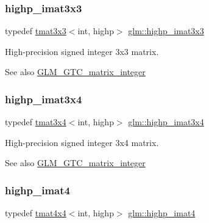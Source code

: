 \subsubsection{\texorpdfstring{highp\+\_\+imat3x3}{highp\_imat3x3}}
{\footnotesize\ttfamily typedef \hyperlink{structglm_1_1tmat3x3}{tmat3x3}$<$int, highp$>$ \hyperlink{group__gtc__matrix__integer_gaecb62c11fb25aadbb7eecc2da226d444}{glm\+::highp\+\_\+imat3x3}}

High-\/precision signed integer 3x3 matrix. \begin{DoxySeeAlso}{See also}
\hyperlink{group__gtc__matrix__integer}{G\+L\+M\+\_\+\+G\+T\+C\+\_\+matrix\+\_\+integer} 
\end{DoxySeeAlso}
\mbox{\label{group__gtc__matrix__integer_gabcd2d8d764b11db413259ee5cafd8446}} 
\subsubsection{\texorpdfstring{highp\+\_\+imat3x4}{highp\_imat3x4}}
{\footnotesize\ttfamily typedef \hyperlink{structglm_1_1tmat3x4}{tmat3x4}$<$int, highp$>$ \hyperlink{group__gtc__matrix__integer_gabcd2d8d764b11db413259ee5cafd8446}{glm\+::highp\+\_\+imat3x4}}

High-\/precision signed integer 3x4 matrix. \begin{DoxySeeAlso}{See also}
\hyperlink{group__gtc__matrix__integer}{G\+L\+M\+\_\+\+G\+T\+C\+\_\+matrix\+\_\+integer} 
\end{DoxySeeAlso}
\mbox{\label{group__gtc__matrix__integer_gaa5eedcb20883541c3f7f2862cbd0b446}} 
\subsubsection{\texorpdfstring{highp\+\_\+imat4}{highp\_imat4}}
{\footnotesize\ttfamily typedef \hyperlink{structglm_1_1tmat4x4}{tmat4x4}$<$int, highp$>$ \hyperlink{group__gtc__matrix__integer_gaa5eedcb20883541c3f7f2862cbd0b446}{glm\+::highp\+\_\+imat4}}

